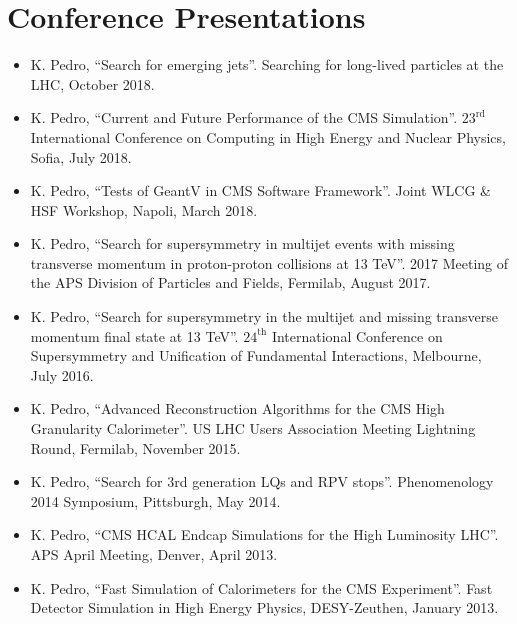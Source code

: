 \section{Conference Presentations}
\begin{itemize}[leftmargin=12pt]
\item K. Pedro, ``Search for emerging jets''. Searching for long-lived particles at the LHC, October 2018.
\item K. Pedro, ``Current and Future Performance of the CMS Simulation''. $23^{\text{rd}}$ International Conference on Computing in High Energy and Nuclear Physics, Sofia, July 2018.
\ifdefined\longflag
\item K. Pedro, ``Tests of GeantV in CMS Software Framework''. Joint WLCG \& HSF Workshop, Napoli, March 2018.
\fi
\item K. Pedro, ``Search for supersymmetry in multijet events with missing transverse momentum in proton-proton collisions at 13 TeV''. 2017 Meeting of the APS Division of Particles and Fields, Fermilab, August 2017.
\item K. Pedro, ``Search for supersymmetry in the multijet and missing transverse momentum final state at 13 TeV''. $24^{\text{th}}$ International Conference on Supersymmetry and Unification of Fundamental Interactions, Melbourne, July 2016.
\item K. Pedro, ``Advanced Reconstruction Algorithms for the CMS High Granularity Calorimeter''. US LHC Users Association Meeting Lightning Round, Fermilab, November 2015.
\item K. Pedro, ``Search for 3rd generation LQs and RPV stops''. Phenomenology 2014 Symposium, Pittsburgh, May 2014.
\item K. Pedro, ``CMS HCAL Endcap Simulations for the High Luminosity LHC''. APS April Meeting, Denver, April 2013.
\item K. Pedro, ``Fast Simulation of Calorimeters for the CMS Experiment''. Fast Detector Simulation in High Energy Physics, DESY-Zeuthen, January 2013.
\end{itemize}

\ifdefined\longflag
